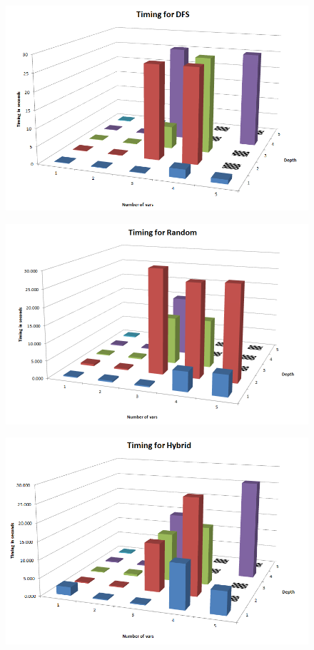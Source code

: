 \documentclass[oribibl]{llncs}
\begin{document}
\begin{figure}[!t]
\centering
\includegraphics[width=13cm]{dfs_timings}
\caption{}
\label{figure:motivation}
\end{figure}

\begin{figure}[!t]
\centering
\includegraphics[width=13cm]{random_timings}
\caption{}
\label{figure:motivation}
\end{figure}

\begin{figure}[!t]
\centering
\includegraphics[width=13cm]{hybrid_timings}
\caption{}
\label{figure:motivation}
\end{figure}
\end{document}
